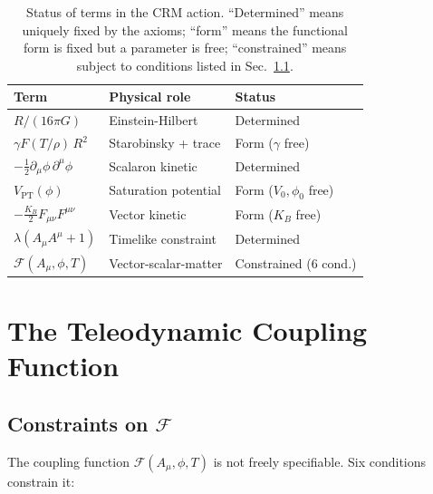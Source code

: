 \documentclass[aps,prd,twocolumn,superscriptaddress,nofootinbib]{revtex4-2}
\begin{document}
\begin{table}[b]
\caption{\label{tab:terms}Status of terms in the CRM action. ``Determined'' means uniquely fixed by the axioms; ``form'' means the functional form is fixed but a parameter is free; ``constrained'' means subject to conditions listed in Sec.~\ref{sec:constraints}.}
\begin{ruledtabular}
\begin{tabular}{lll}
Term & Physical role & Status \\
\hline
$R/(16\pi G)$ & Einstein-Hilbert & Determined \\
$\gamma F(T/\rho)\,R^2$ & Starobinsky + trace & Form ($\gamma$ free) \\
$-\frac{1}{2}\partial_\mu\phi\,\partial^\mu\phi$ & Scalaron kinetic & Determined \\
$V_{\mathrm{PT}}(\phi)$ & Saturation potential & Form ($V_0, \phi_0$ free) \\
$-\frac{K_B}{2}F_{\mu\nu}F^{\mu\nu}$ & Vector kinetic & Form ($K_B$ free) \\
$\lambda(A_\mu A^\mu + 1)$ & Timelike constraint & Determined \\
$\mathcal{F}(A_\mu, \phi, T)$ & Vector-scalar-matter & Constrained (6 cond.) \\
\end{tabular}
\end{ruledtabular}
\end{table}


\section{The Teleodynamic Coupling Function}
\label{sec:coupling}

\subsection{Constraints on $\mathcal{F}$}
\label{sec:constraints}

The coupling function $\mathcal{F}(A_\mu, \phi, T)$ is not freely specifiable. Six conditions constrain it:
\end{document}
